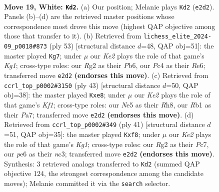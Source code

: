\documentclass[11pt]{article}
\begin{document}
\clearpage

\begin{figure}[p]\centering
\begin{subfigure}{0.46\textwidth}\centering
\resizebox{\linewidth}{!}{%
\newchessgame
\chessboard[
  setfen={2k4r/ppp2ppp/4p3/4N3/2P1r3/8/PP2KPRP/1R6 w - - 1 19},
  showmover=false,
  pgfstyle=straightmove, color=movearrow, markmove={e2-d2}
]}
\caption{}
\end{subfigure}\hfill
\begin{subfigure}{0.46\textwidth}\centering
\resizebox{\linewidth}{!}{%
\newchessgame
\chessboard[
  setfen={3R2k1/7p/1p2rp2/4pp2/2P2n2/1P6/P4PPP/R5K1 b - - 0 27},
  showmover=false,
  pgfstyle=straightmove, color=movearrow, markmove={g8-g7}
]}
\caption{}
\end{subfigure}
\\[4pt]
\begin{subfigure}{0.46\textwidth}\centering
\resizebox{\linewidth}{!}{%
\newchessgame
\chessboard[
  setfen={4Rk1r/pN3p2/2n5/3p2pp/3P2P1/7P/PPK2P2/3R4 b - - 0 22},
  showmover=false,
  pgfstyle=straightmove, color=movearrow, markmove={f8-e8}
]}
\caption{}
\end{subfigure}\hfill
\begin{subfigure}{0.46\textwidth}\centering
\resizebox{\linewidth}{!}{%
\newchessgame
\chessboard[
  setfen={5Rk1/ppp3p1/7r/3P3p/2n5/2N1p3/PPP3PP/4R1K1 b - - 0 21},
  showmover=false,
  pgfstyle=straightmove, color=movearrow, markmove={g8-f8}
]}
\caption{}
\end{subfigure}
\caption{\textbf{Move 19, White: \texttt{Kd2}.} (a) Our position; Melanie plays \texttt{Kd2} (\texttt{e2d2}). Panels (b)--(d) are the retrieved master positions whose correspondence most drove this move (highest QAP objective among those that transfer to it). (b) Retrieved from \texttt{lichess\_elite\_2024-09\_p0018\#873} (ply 53) [structural distance $d$=48, QAP obj=51]: the master played \texttt{Kg7}; under $\mu$ our \emph{Ke2} plays the role of that game's \emph{Kg1}; cross-type roles: our \emph{R}g2 as their \emph{P}b6, our \emph{P}c4 as their \emph{R}e6; transferred move \texttt{e2d2} \textbf{(endorses this move)}. (c) Retrieved from \texttt{ccrl\_top\_p0002\#3150} (ply 43) [structural distance $d$=50, QAP obj=38]: the master played \texttt{Kxe8}; under $\mu$ our \emph{Ke2} plays the role of that game's \emph{Kf1}; cross-type roles: our \emph{N}e5 as their \emph{R}h8, our \emph{R}b1 as their \emph{P}a7; transferred move \texttt{e2d2} \textbf{(endorses this move)}. (d) Retrieved from \texttt{ccrl\_top\_p0002\#349} (ply 41) [structural distance $d$=51, QAP obj=35]: the master played \texttt{Kxf8}; under $\mu$ our \emph{Ke2} plays the role of that game's \emph{Kg1}; cross-type roles: our \emph{R}g2 as their \emph{P}c7, our \emph{p}e6 as their \emph{n}c3; transferred move \texttt{e2d2} \textbf{(endorses this move)}. Synthesis: 3 retrieved analogs transferred to \texttt{Kd2} (summed QAP objective 124, the strongest correspondence among the candidate moves); Melanie committed it via the \texttt{search} selector.}
\label{fig:thought-m36}
\end{figure}
\end{document}
